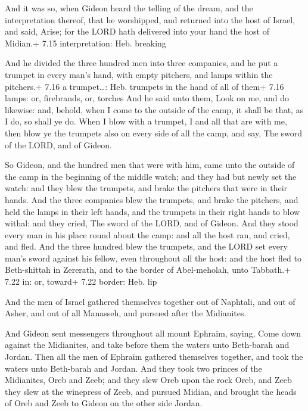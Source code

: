  And it was so, when Gideon heard the telling of the
dream, and the interpretation thereof, that he worshipped, and returned
into the host of Israel, and said, Arise; for the LORD hath delivered
into your hand the host of Midian.+ 7.15 interpretation: Heb. breaking

 And he divided the three hundred men into three companies,
and he put a trumpet in every man's hand, with empty pitchers, and lamps
within the pitchers.+ 7.16 a trumpet\ldots: Heb. trumpets in the hand of
all of them+ 7.16 lamps: or, firebrands, or, torches  And
he said unto them, Look on me, and do likewise: and, behold, when I come
to the outside of the camp, it shall be that, as I do, so shall ye do.
 When I blow with a trumpet, I and all that are with me,
then blow ye the trumpets also on every side of all the camp, and say,
The sword of the LORD, and of Gideon.

 So Gideon, and the hundred men that were with him, came
unto the outside of the camp in the beginning of the middle watch; and
they had but newly set the watch: and they blew the trumpets, and brake
the pitchers that were in their hands.  And the three
companies blew the trumpets, and brake the pitchers, and held the lamps
in their left hands, and the trumpets in their right hands to blow
withal: and they cried, The sword of the LORD, and of Gideon.
 And they stood every man in his place round about the
camp: and all the host ran, and cried, and fled.  And the
three hundred blew the trumpets, and the LORD set every man's sword
against his fellow, even throughout all the host: and the host fled to
Beth-shittah in Zererath, and to the border of Abel-meholah, unto
Tabbath.+ 7.22 in: or, toward+ 7.22 border: Heb. lip

 And the men of Israel gathered themselves together out of
Naphtali, and out of Asher, and out of all Manasseh, and pursued after
the Midianites.

 And Gideon sent messengers throughout all mount Ephraim,
saying, Come down against the Midianites, and take before them the
waters unto Beth-barah and Jordan. Then all the men of Ephraim gathered
themselves together, and took the waters unto Beth-barah and Jordan.
 And they took two princes of the Midianites, Oreb and
Zeeb; and they slew Oreb upon the rock Oreb, and Zeeb they slew at the
winepress of Zeeb, and pursued Midian, and brought the heads of Oreb and
Zeeb to Gideon on the other side Jordan.

